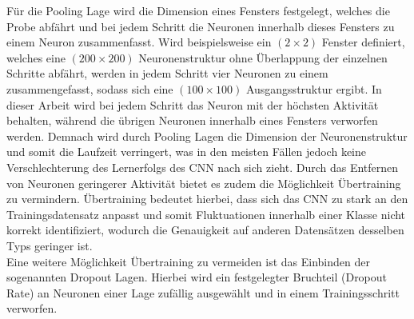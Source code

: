 Für die Pooling Lage wird die Dimension eines Fensters festgelegt, welches die Probe abfährt und bei jedem Schritt die Neuronen innerhalb dieses Fensters zu einem Neuron zusammenfasst. Wird beispielsweise ein $(2\times 2)$ Fenster definiert, welches eine $(200 \times 200)$ Neuronenstruktur ohne Überlappung der einzelnen Schritte abfährt, werden in jedem Schritt vier Neuronen zu einem zusammengefasst, sodass sich eine $(100\times 100)$ Ausgangsstruktur ergibt. In dieser Arbeit wird bei jedem Schritt das Neuron mit der höchsten Aktivität behalten, während die übrigen Neuronen innerhalb eines Fensters verworfen werden. Demnach wird durch Pooling Lagen die Dimension der Neuronenstruktur und somit die Laufzeit verringert, was in den meisten Fällen jedoch keine Verschlechterung des Lernerfolgs des CNN nach sich zieht. Durch das Entfernen von Neuronen geringerer Aktivität bietet es zudem die Möglichkeit Übertraining zu vermindern. Übertraining bedeutet hierbei, dass sich das CNN zu stark an den Trainingsdatensatz anpasst und somit Fluktuationen innerhalb einer Klasse nicht korrekt identifiziert, wodurch die Genauigkeit auf anderen Datensätzen desselben Typs geringer ist. \\
Eine weitere Möglichkeit Übertraining zu vermeiden ist das Einbinden der sogenannten Dropout Lagen. Hierbei wird ein festgelegter Bruchteil (Dropout Rate) an Neuronen einer Lage zufällig ausgewählt und in einem Trainingsschritt verworfen. \\
\captionsetup[table]{name=Abbildung}
